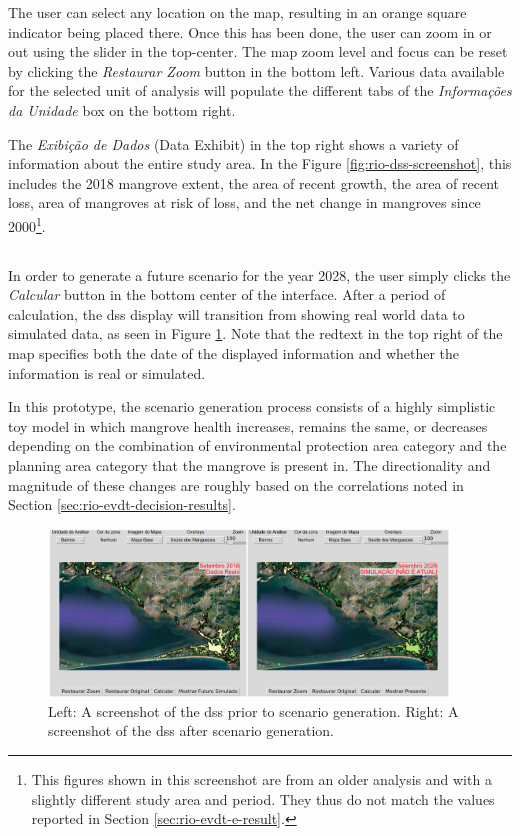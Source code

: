 The user can select any location on the map, resulting in an orange square indicator being placed there. Once this has been done, the user can zoom in or out using the slider in the top-center. The map zoom level and focus can be reset by clicking the \textit{Restaurar Zoom} button in the bottom left. Various data available for the selected unit of analysis will populate the different tabs of the \textit{Informações da Unidade} box on the bottom right. 

The \textit{Exibição de Dados} (Data Exhibit) in the top right shows a variety of information about the entire study area. In the Figure \ref{fig:rio-dss-screenshot}, this includes the 2018 mangrove extent, the area of recent growth, the area of recent loss, area of mangroves at risk of loss, and the net change in mangroves since 2000\footnote{This figures shown in this screenshot are from an older analysis and with a slightly different study area and period. They thus do not match the values reported in Section \ref{sec:rio-evdt-e-result}.}. 

\subsection{}

In order to generate a future scenario for the year 2028, the user simply clicks the \textit{Calcular} button in the bottom center of the interface. After a period of calculation, the \ac{dss} display will transition from showing real world data to simulated data, as seen in Figure \ref{fig:rio-dss-simulation}. Note that the redtext in the top right of the map specifies both the date of the displayed information and whether the information is real or simulated.

In this prototype, the scenario generation process consists of a highly simplistic toy model in which mangrove health increases, remains the same, or decreases depending on the combination of environmental protection area category and the planning area category that the mangrove is present in. The directionality and magnitude of these changes are roughly based on the correlations noted in Section \ref{sec:rio-evdt-decision-results}. 

\begin{figure}[!htb] 
\centering
\includegraphics[width=0.95\textwidth]{Figures/chap4/rio-dss-simulation.png}
\caption[Demonstration of the Rio DSS Scenario Generation]{Left: A screenshot of the \ac{dss} prior to scenario generation. Right: A screenshot of the \ac{dss} after scenario generation.}
\label{fig:rio-dss-simulation}
\end{figure}

